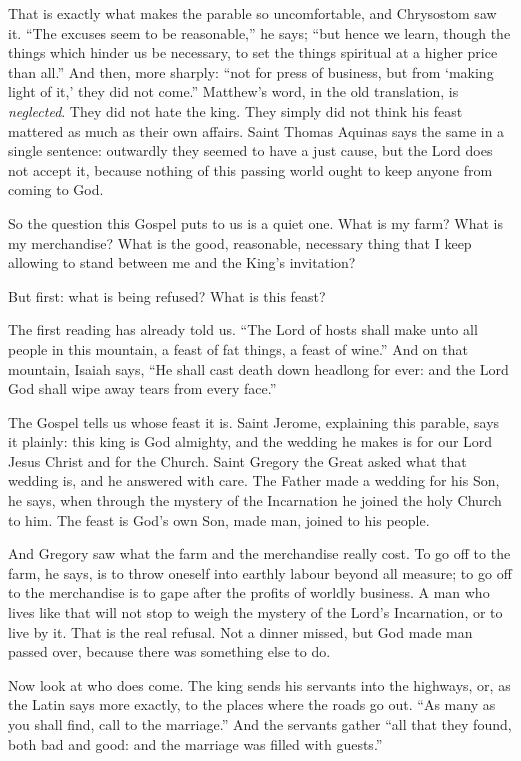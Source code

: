 That is exactly what makes the parable so uncomfortable, and Chrysostom saw
it. ``The excuses seem to be reasonable,'' he says; ``but hence we learn,
though the things which hinder us be necessary, to set the things spiritual
at a higher price than all.'' And then, more sharply: ``not for press of
business, but from `making light of it,' they did not come.'' Matthew's word, in
the old translation, is \emph{neglected}. They did not hate the king. They simply did not
think his feast mattered as much as their own affairs. Saint Thomas Aquinas
says the same in a single sentence: outwardly they seemed to have a just
cause, but the Lord does not accept it, because nothing of this passing world
ought to keep anyone from coming to God.

So the question this Gospel puts to us is a quiet one. What is my farm? What
is my merchandise? What is the good, reasonable, necessary thing that I keep
allowing to stand between me and the King's invitation?

\bigskip

But first: what is being refused? What is this feast?

The first reading has already told us. ``The Lord of hosts shall make unto all
people in this mountain, a feast of fat things, a feast of wine.'' And on that
mountain, Isaiah says, ``He shall cast death down headlong for ever: and the
Lord God shall wipe away tears from every face.''

The Gospel tells us whose feast it is. Saint Jerome, explaining this parable,
says it plainly: this king is God almighty, and the wedding he makes is for
our Lord Jesus Christ and for the Church. Saint Gregory the Great asked what
that wedding is, and he answered with care.
The Father made a wedding for his Son, he says, when through the mystery of
the Incarnation he joined the holy Church to him. The feast is God's own Son,
made man, joined to his people.

And Gregory saw what the farm and the merchandise really cost. To go off to
the farm, he says, is to throw oneself into earthly labour beyond all measure;
to go off to the merchandise is to gape after the profits of worldly business.
A man who lives like that will not stop to weigh the mystery of the Lord's
Incarnation, or to live by it. That is the real refusal. Not a dinner missed,
but God made man passed over, because there was something else to do.

\bigskip

Now look at who does come. The king sends his servants into the highways, or,
as the Latin says more exactly, to the places where the roads go out. ``As
many as you shall find, call to the marriage.'' And the servants gather ``all
that they found, both bad and good: and the marriage was filled with guests.''

